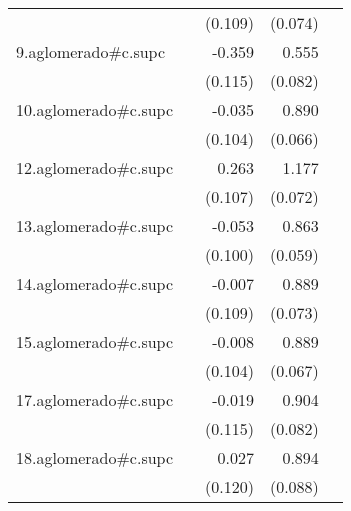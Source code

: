{\begin{longtable}{l*{4}{D{.}{.}{-1}}}
            &                     &     (0.109)         &     (0.074)         &                     \\
\addlinespace
9.aglomerado#c.supc&                     &      -0.359\sym{**} &       0.555\sym{***}&                     \\
            &                     &     (0.115)         &     (0.082)         &                     \\
\addlinespace
10.aglomerado#c.supc&                     &      -0.035         &       0.890\sym{***}&                     \\
            &                     &     (0.104)         &     (0.066)         &                     \\
\addlinespace
12.aglomerado#c.supc&                     &       0.263\sym{*}  &       1.177\sym{***}&                     \\
            &                     &     (0.107)         &     (0.072)         &                     \\
\addlinespace
13.aglomerado#c.supc&                     &      -0.053         &       0.863\sym{***}&                     \\
            &                     &     (0.100)         &     (0.059)         &                     \\
\addlinespace
14.aglomerado#c.supc&                     &      -0.007         &       0.889\sym{***}&                     \\
            &                     &     (0.109)         &     (0.073)         &                     \\
\addlinespace
15.aglomerado#c.supc&                     &      -0.008         &       0.889\sym{***}&                     \\
            &                     &     (0.104)         &     (0.067)         &                     \\
\addlinespace
17.aglomerado#c.supc&                     &      -0.019         &       0.904\sym{***}&                     \\
            &                     &     (0.115)         &     (0.082)         &                     \\
\addlinespace
18.aglomerado#c.supc&                     &       0.027         &       0.894\sym{***}&                     \\
            &                     &     (0.120)         &     (0.088)         &                     \\

\end{longtable}}
